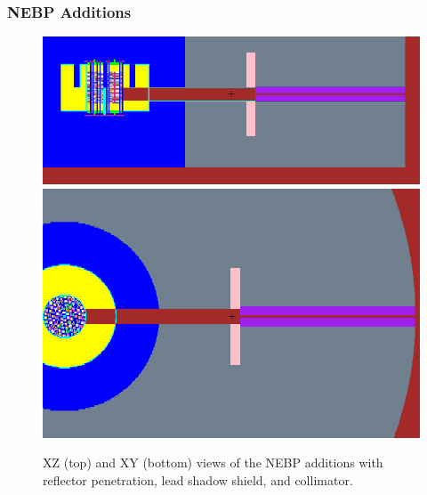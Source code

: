 \documentclass[fleqn]{beamer}
\begin{document}
\begin{frame}
\frametitle{NEBP Additions}

\begin{figure}
\centering
\includegraphics[trim=0 40 0 20, clip, width = .9\textwidth]{mcnp_newxz}\\
\includegraphics[trim=0 120 0 120, clip, width = .9\textwidth]{mcnp_newxy}
\caption{XZ (top) and XY (bottom) views of the NEBP additions with reflector penetration, lead shadow shield, and collimator.}
\end{figure}

\end{frame}
\end{document}
